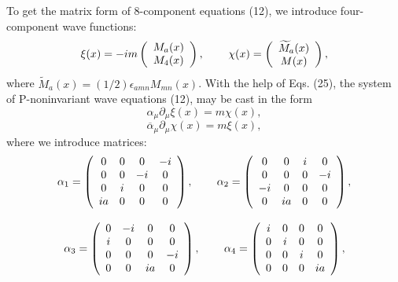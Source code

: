 \documentclass[a4paper,12pt]{article}
\begin{document}
To get the matrix form of 8-component equations (12), we introduce
four-component wave functions:
\begin{equation}
\xi (x)=-im\left(
\begin{array}{c}
M_a(x) \\
M_4(x)
\end{array}
\right) ,\hspace{0.3in}\chi (x)=\left(
\begin{array}{c}
\widetilde{M}_a(x) \\
M(x)
\end{array}
\right) , \label{25}
\end{equation}
where $\widetilde{M}_a(x)=(1/2)\epsilon _{amn}M_{mn}(x)$. With the
help of Eqs. (25), the system of P-noninvariant wave equations
(12), may be cast in the form
\[
\alpha _\mu \partial _\mu \xi (x)=m\chi (x),
\]
\vspace{-8mm}
\begin{equation}
\label{26}
\end{equation}
\vspace{-8mm}
\[
\overline{\alpha }_\mu \partial _\mu \chi (x)=m\xi (x),
\]
where we introduce matrices:
\[
\alpha _1=\left(
\begin{array}{cccc}
0 & 0 & 0 & -i \\
0 & 0 & -i & 0 \\
0 & i & 0 & 0 \\
ia & 0 & 0 & 0
\end{array}
\right) ,\hspace{0.3in}\alpha _2=\left(
\begin{array}{cccc}
0 & 0 & i & 0 \\
0 & 0 & 0 & -i \\
-i & 0 & 0 & 0 \\
0 & ia & 0 & 0
\end{array}
\right) ,
\]
\vspace{-7mm}
\begin{equation}
\label{27}
\end{equation}
\vspace{-7mm}
\[
\alpha _3=\left(
\begin{array}{cccc}
0 & -i & 0 & 0 \\
i & 0 & 0 & 0 \\
0 & 0 & 0 & -i \\
0 & 0 & ia & 0
\end{array}
\right) ,\hspace{0.3in}\alpha_4=\left(
\begin{array}{cccc}
i & 0 & 0 & 0 \\
0 & i & 0 & 0 \\
0 & 0 & i & 0 \\
0 & 0 & 0 & ia
\end{array}
\right) ,
\]
\end{document}

